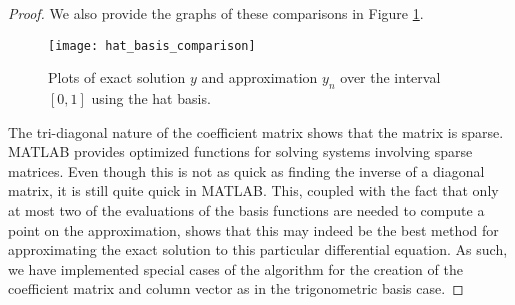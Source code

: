 \begin{proof}
  We also provide the graphs of these comparisons in Figure \ref{hat_plot}.

  \begin{figure}[h!]
    \begin{center}
      \texttt{[image: hat\_basis\_comparison]}
    \end{center}
    \caption{Plots of exact solution $y$ and approximation $y_n$ over the interval $[0, 1]$
      using the hat basis.}\label{hat_plot}
  \end{figure}

  The tri-diagonal nature of the coefficient matrix shows that the matrix is sparse.
  MATLAB provides optimized functions for solving systems involving sparse matrices.
  Even though this is not as quick as finding the inverse of a diagonal matrix,
  it is still quite quick in MATLAB. This, coupled with the fact that only at most
  two of the evaluations of the basis functions are needed to compute a point
  on the approximation, shows that this may indeed be the best method for approximating
  the exact solution to this particular differential equation. As such, we have implemented
  special cases of the algorithm for the creation of the coefficient matrix and column vector
  as in the trigonometric basis case.

\end{proof}